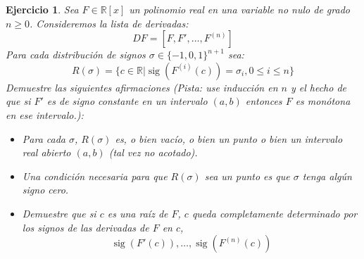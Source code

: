 \documentclass[10pt]{article}
\newtheorem{ejer}{Ejercicio}
\theoremstyle{definition}
\newcommand{\RR}{\mathbb{R}}
\newcommand{\RRx}{\mathbb{R}[x]}
\newcommand{\sig}{\operatorname{sig}}
\begin{document}
\begin{ejer} Sea $F\in\RRx$ un polinomio real en una variable no nulo de grado $n\geq 0$. Consideremos la lista de derivadas:
\[DF=[F,F',\ldots,F^{(n)}]\]
Para cada distribución de signos $\sigma\in\{-1,0,1\}^{n+1}$ sea:
\[R(\sigma)=\{c\in\RR|\sig(F^{(i)}(c))=\sigma_{i},0\leq i\leq n\}\]
Demuestre las siguientes afirmaciones (Pista: use inducción en $n$ y el hecho de que si $F'$ es de signo constante en un intervalo $(a,b)$ entonces $F$ es monótona en ese intervalo.):
\begin{itemize}
    \item Para cada $\sigma$, $R(\sigma)$ es, o bien vacío, o bien un punto o bien un intervalo real abierto $(a,b)$ (tal vez no acotado).
    \item Una condición necesaria para que $R(\sigma)$ sea un punto es que $\sigma$ tenga algún signo cero.
    \item Demuestre que si $c$ es una raíz de $F$, $c$ queda completamente determinado por los signos de las derivadas de $F$ en $c$,
    \[\sig(F'(c)),\ldots,\sig(F^{(n)}(c))\]
\end{itemize}
\end{ejer}
\end{document}
